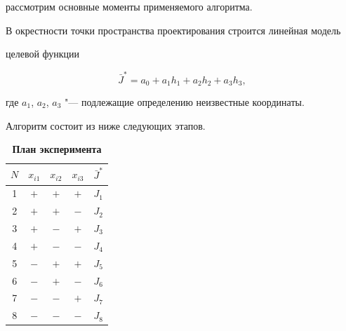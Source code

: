 рассмотрим основные моменты применяемого алгоритма.



В окрестности точки пространства проектирования строится линейная модель

целевой функции

\begin{equation}

\label{dedov:eq10}

\bar {J}^\ast =a_0 +a_1 h_1 +a_2 h_2 +a_3 h_3 ,

\end{equation}

где $a_1$, $a_2$, $a_3 $ "--- подлежащие определению неизвестные координаты.



Алгоритм состоит из ниже следующих этапов.



\begin{table}

\footnotesize \vspace{-3mm}

\caption{\bf План эксперимента} \vspace{-3mm}

\begin{tabular}{c|c|c|c|c}

\hline

$N$& $x_{i1} $& $x_{i2} $& $x_{i3} $& $\bar {J}^\ast $ \\

\hline

1 & $+$ & $+$ & $+$ & $J_1$ \\

2 & $+$ & $+$ & $-$ & $J_2$ \\

3 & $+$ & $-$ & $+$ & $J_3$ \\

4 & $+$ & $-$ & $-$ & $J_4$ \\

5 & $-$ & $+$ & $+$ & $J_5$ \\

6 & $-$ & $+$ & $-$ & $J_6$ \\

7 & $-$ & $-$ & $+$ & $J_7$ \\

8 & $-$ & $-$ & $-$ & $J_8$ \\

\hline

\end{tabular} \vspace{2mm}

\end{table}



